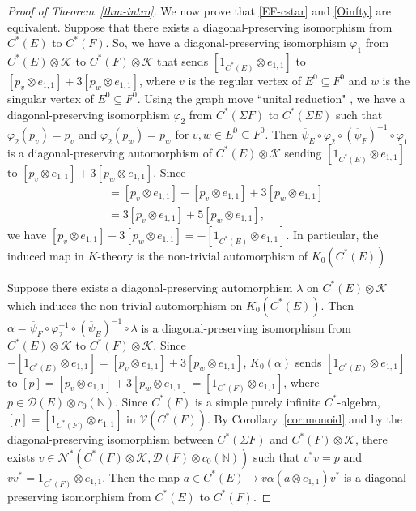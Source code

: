 \documentclass[11pt, letterpaper,final]{amsart}
\newcommand{\NN}{\mathbb{N}}
\newcommand{\Kk}{\mathcal{K}}
\newcommand{\V}{\mathcal{V}}
\newcommand{\D}{\mathcal{D}}
\newcommand{\N}{\mathcal{N}}
\theoremstyle{definition}
\theoremstyle{remark}
\begin{document}
\begin{proof}[Proof of Theorem~\ref{thm-intro}]
We now prove that \eqref{EF-cstar} and \eqref{Oinfty} are equivalent.  Suppose that there exists a diagonal-preserving isomorphism from $C^*(E)$ to $C^*(F)$.  So, we have a diagonal-preserving isomorphism $\varphi_1$ from $C^*(E) \otimes \Kk$ to $C^*(F) \otimes \Kk$ that sends $[1_{C^*(E)} \otimes e_{1,1}]$ to $[p_v\otimes e_{1,1}] + 3 [p_w\otimes e_{1,1}]$, where $v$ is the regular vertex of $E^0 \subseteq F^0$ and $w$ is the singular vertex of $E^0 \subseteq F^0$.  Using the graph move ``unital reduction" \cite[Theorem~2.3.2]{ER-Refined}, we have a diagonal-preserving isomorphism $\varphi_2$ from $C^*(\Sigma F)$ to $C^*(\Sigma E)$ such that $\varphi_2( p_v)=p_v$ and $\varphi_2(p_w)=p_w$ for $v , w \in E^0 \subseteq F^0$.  Then $\overline{\psi}_E \circ \varphi_2 \circ (\overline{\psi}_F)^{-1} \circ \varphi_1$ is a diagonal-preserving automorphism of $C^*(E) \otimes \Kk$ sending $[1_{C^*(E)} \otimes e_{1,1}]$ to $[p_v\otimes e_{1,1}] + 3[p_w\otimes e_{1,1}]$.  Since 
\begin{align*}[1_{C^*(E)} \otimes e_{1,1} ] &= [p_v \otimes e_{1,1}] + [p_v \otimes e_{1,1}] + 3[p_w \otimes e_{1,1}] \\ &= 3[p_v \otimes e_{1,1}] + 5[p_w \otimes e_{1,1}],\end{align*}
we have $[p_v \otimes e_{1,1}]+3[p_w \otimes e_{1,1}] = -[1_{C^*(E)}\otimes e_{1,1}]$.  In particular, the induced map in $K$-theory is the non-trivial automorphism of $K_0(C^*(E))$.  

Suppose there exists a diagonal-preserving automorphism $\lambda$ on $C^*(E)\otimes \Kk$ which induces the non-trivial automorphism on $K_0(C^*(E))$.  Then $\alpha=\overline{\psi}_F \circ \varphi_2^{-1} \circ (\overline{\psi}_E)^{-1}\circ \lambda$ is a diagonal-preserving isomorphism from $C^*(E) \otimes \Kk$ to $C^*(F) \otimes \Kk$.  Since $-[1_{C^*(E)}\otimes e_{1,1}]=[p_v \otimes e_{1,1}]+3[p_w \otimes e_{1,1}]$, $K_0(\alpha)$ sends $[1_{C^*(E)} \otimes e_{1,1} ]$ to $[p] = [p_v \otimes e_{1,1}]+3[p_w \otimes e_{1,1}] = [ 1_{C^*(F)} \otimes e_{1,1} ]$, where $p \in \D(E) \otimes c_0(\NN)$.  Since $C^*(F)$ is a simple purely infinite $C^*$-algebra, $[p] = [ 1_{C^*(F)} \otimes e_{1,1} ]$ in $\V(C^*(F))$.  By Corollary~\ref{cor:monoid} and by the diagonal-preserving isomorphism between $C^*(\Sigma F)$ and $C^*(F) \otimes \Kk$, there exists $v \in \N^*( C^*(F)\otimes \Kk, \mathcal{D}(F) \otimes c_0(\NN))$ such that $v^*v = p$ and $vv^*=1_{C^*(F)} \otimes e_{1,1}$.  Then the map $a \in C^*(E) \mapsto v \alpha(a \otimes e_{1,1}) v^*$ is a diagonal-preserving isomorphism from $C^*(E)$ to $C^*(F)$.


\end{proof}
\end{document}
